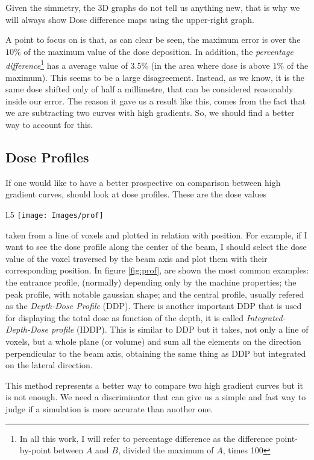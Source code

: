 \documentclass[12pt, a4paper, twoside]{book}
\begin{document}
Given the simmetry, the 3D graphs do not tell us anything new, that is why we will always show Dose difference maps using the upper-right graph.

A point to focus on is that, as can clear be seen, the maximum error is over the $10\%$ of the maximum value of the dose deposition. In addition, the \emph{percentage difference}\footnote{In all this work, I will refer to percentage difference as the difference point-by-point between $A$ and $B$, divided the maximum of $A$, times 100} has a average value of $3.5\%$ (in the area where dose is above $1\%$ of the maximum). 
This seems to be a large disagreement. Instead, as we know, it is the same dose shifted only of half a millimetre, that can be considered reasonably inside our error. The reason it gave us a result like this, comes from the fact that we are subtracting two curves with high gradients. So, we should find a better way to account for this.

\subsection{Dose Profiles}
If one would like to have a better prospective on comparison between  high gradient curves, should look at dose profiles. 
These are the dose values
\begin{wrapfigure}{l}{.5\textwidth}
{\texttt{[image: Images/prof]}}
\caption{Profiles example}
\label{fig:prof}
\vspace{-5mm}
\end{wrapfigure}
\noindent taken from a line of voxels and plotted in relation with position. For example, if I want to see the dose profile along the center of the beam, I should select the dose value of the voxel traversed by the beam axis and plot them with their corresponding position.
In figure \ref{fig:prof}, are shown the most common examples: the entrance profile, (normally) depending only by the machine properties; the peak profile, with notable gaussian shape; and the central profile, usually refered as the \emph{Depth-Dose Profile} (DDP). There is another important DDP that is used for displaying the total dose as function of the depth, it is called \emph{Integrated-Depth-Dose profile} (IDDP). This is similar to DDP but it takes, not only a line of voxels, but a whole plane (or volume) and sum all the elements on the direction perpendicular to the beam axis, obtaining the same thing as DDP but integrated on the lateral direction.

This method represents a better way to compare two high gradient curves but it is not enough. We need a discriminator that can give us a simple and fast way to judge if a simulation is more accurate than another one.
\end{document}
